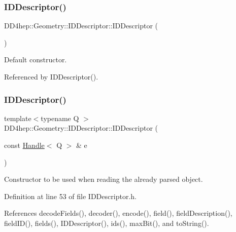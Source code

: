 \subsubsection{\texorpdfstring{I\+D\+Descriptor()}{IDDescriptor()}\hspace{0.1cm}{\footnotesize\ttfamily [1/3]}}
{\footnotesize\ttfamily D\+D4hep\+::\+Geometry\+::\+I\+D\+Descriptor\+::\+I\+D\+Descriptor (\begin{DoxyParamCaption}{ }\end{DoxyParamCaption})\hspace{0.3cm}{\ttfamily [default]}}



Default constructor. 



Referenced by I\+D\+Descriptor().

\hypertarget{class_d_d4hep_1_1_geometry_1_1_i_d_descriptor_aaa327c8a2e0ed097034624c1cb2e3f8c}{}\label{class_d_d4hep_1_1_geometry_1_1_i_d_descriptor_aaa327c8a2e0ed097034624c1cb2e3f8c} 
\subsubsection{\texorpdfstring{I\+D\+Descriptor()}{IDDescriptor()}\hspace{0.1cm}{\footnotesize\ttfamily [2/3]}}
{\footnotesize\ttfamily template$<$typename Q $>$ \\
D\+D4hep\+::\+Geometry\+::\+I\+D\+Descriptor\+::\+I\+D\+Descriptor (\begin{DoxyParamCaption}\item[{const \hyperlink{class_d_d4hep_1_1_handle}{Handle}$<$ Q $>$ \&}]{e }\end{DoxyParamCaption})\hspace{0.3cm}{\ttfamily [inline]}}



Constructor to be used when reading the already parsed object. 



Definition at line 53 of file I\+D\+Descriptor.\+h.



References decode\+Fields(), decoder(), encode(), field(), field\+Description(), field\+I\+D(), fields(), I\+D\+Descriptor(), ids(), max\+Bit(), and to\+String().

